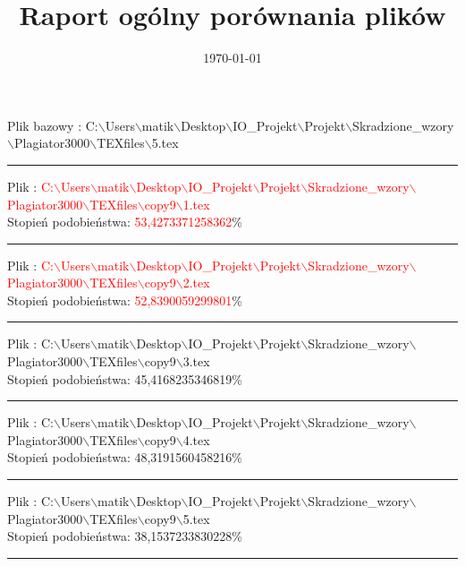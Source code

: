 \documentclass{article}
\begin{document}
\title{\huge\bfseries Raport ogólny porównania plików }
\date{\today}
\maketitle
\begin{flushleft}
Plik bazowy : C:$\backslash$Users$\backslash$matik$\backslash$Desktop$\backslash$IO\_Projekt$\backslash$Projekt$\backslash$Skradzione\_wzory$\backslash$Plagiator3000$\backslash$TEXfiles$\backslash$5.tex
\end{flushleft}
\hrule
\begin{flushleft}
Plik : \textcolor{Red}{C:$\backslash$Users$\backslash$matik$\backslash$Desktop$\backslash$IO\_Projekt$\backslash$Projekt$\backslash$Skradzione\_wzory$\backslash$Plagiator3000$\backslash$TEXfiles$\backslash$copy9$\backslash$1.tex}\\
{\huge Stopień podobieństwa: \textcolor{Red}{53,4273371258362}\%} \\ 

\end{flushleft}
\hrule
\begin{flushleft}
Plik : \textcolor{Red}{C:$\backslash$Users$\backslash$matik$\backslash$Desktop$\backslash$IO\_Projekt$\backslash$Projekt$\backslash$Skradzione\_wzory$\backslash$Plagiator3000$\backslash$TEXfiles$\backslash$copy9$\backslash$2.tex}\\
{\huge Stopień podobieństwa: \textcolor{Red}{52,8390059299801}\%} \\ 

\end{flushleft}
\hrule
\begin{flushleft}
Plik : C:$\backslash$Users$\backslash$matik$\backslash$Desktop$\backslash$IO\_Projekt$\backslash$Projekt$\backslash$Skradzione\_wzory$\backslash$Plagiator3000$\backslash$TEXfiles$\backslash$copy9$\backslash$3.tex\\
{\huge Stopień podobieństwa: 45,4168235346819\%} \\ 

\end{flushleft}
\hrule
\begin{flushleft}
Plik : C:$\backslash$Users$\backslash$matik$\backslash$Desktop$\backslash$IO\_Projekt$\backslash$Projekt$\backslash$Skradzione\_wzory$\backslash$Plagiator3000$\backslash$TEXfiles$\backslash$copy9$\backslash$4.tex\\
{\huge Stopień podobieństwa: 48,3191560458216\%} \\ 

\end{flushleft}
\hrule
\begin{flushleft}
Plik : C:$\backslash$Users$\backslash$matik$\backslash$Desktop$\backslash$IO\_Projekt$\backslash$Projekt$\backslash$Skradzione\_wzory$\backslash$Plagiator3000$\backslash$TEXfiles$\backslash$copy9$\backslash$5.tex\\
{\huge Stopień podobieństwa: 38,1537233830228\%} \\ 

\end{flushleft}
\hrule
\end{document}

